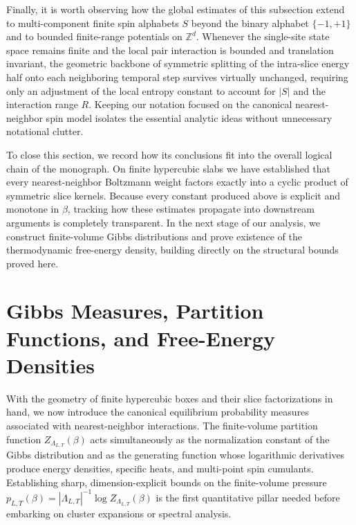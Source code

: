 \documentclass[11pt]{article}
\theoremstyle{definition}
\begin{document}
Finally, it is worth observing how the global estimates of this subsection extend to
multi-component finite spin alphabets $S$ beyond the binary alphabet $\{-1, +1\}$
and to bounded finite-range potentials on $\mathbb{Z}^d$. Whenever the single-site
state space remains finite and the local pair interaction is bounded and translation
invariant, the geometric backbone of symmetric splitting of the intra-slice energy
half onto each neighboring temporal step survives virtually unchanged, requiring
only an adjustment of the local entropy constant to account for $|S|$ and the
interaction range $R$. Keeping our notation focused on the canonical
nearest-neighbor spin model isolates the essential analytic ideas without
unnecessary notational clutter.

To close this section, we record how its conclusions fit into the overall logical
chain of the monograph. On finite hypercubic slabs we have established that every
nearest-neighbor Boltzmann weight factors exactly into a cyclic product of symmetric
slice kernels. Because every constant produced above is explicit and monotone in
$\beta$, tracking how these estimates propagate into downstream arguments is
completely transparent. In the next stage of our analysis, we construct
finite-volume Gibbs distributions and prove existence of the thermodynamic
free-energy density, building directly on the structural bounds proved here.

\section{Gibbs Measures, Partition Functions, and Free-Energy Densities}
\label{sec:s02}

With the geometry of finite hypercubic boxes and their slice factorizations in hand,
we now introduce the canonical equilibrium probability measures associated with
nearest-neighbor interactions. The finite-volume partition function
$Z_{\Lambda_{L,T}}(\beta)$ acts simultaneously as the normalization constant of the
Gibbs distribution and as the generating function whose logarithmic derivatives
produce energy densities, specific heats, and multi-point spin cumulants.
Establishing sharp, dimension-explicit bounds on the finite-volume pressure
$p_{L,T}(\beta) = |\Lambda_{L,T}|^{-1} \log Z_{\Lambda_{L,T}}(\beta)$ is the first
quantitative pillar needed before embarking on cluster expansions or spectral
analysis.
\end{document}
